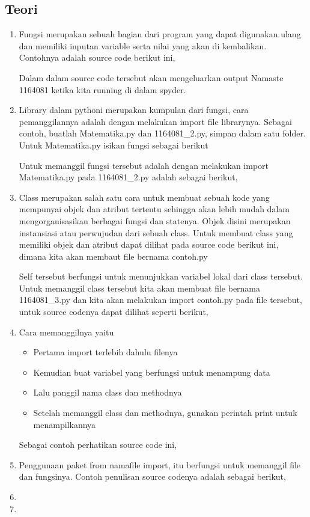 \subsection{Teori}
\begin{enumerate}
\item Fungsi merupakan sebuah bagian dari program yang dapat digunakan ulang dan memiliki inputan variable serta nilai yang akan di kembalikan. Contohnya adalah source code berikut ini,
	 
Dalam dalam source code tersebut akan mengeluarkan output Namaste 1164081 ketika kita running di dalam spyder.

\item Library dalam pythoni merupakan kumpulan dari fungsi, cara pemanggilannya adalah dengan melakukan import file librarynya. Sebagai contoh, buatlah Matematika.py dan 1164081\_2.py, simpan dalam satu folder. Untuk Matematika.py isikan fungsi sebagai berikut
	 
Untuk memanggil fungsi tersebut adalah dengan melakukan import  Matematika.py pada 1164081\_2.py adalah sebagai berikut,
	 

\item Class merupakan salah satu cara untuk membuat sebuah kode yang mempunyai objek dan atribut tertentu sehingga akan lebih mudah dalam mengorganisasikan berbagai fungsi dan statenya. Objek disini merupakan instansiasi atau perwujudan dari sebuah class. Untuk membuat class yang memiliki objek dan atribut dapat dilihat pada source code berikut ini, dimana kita akan membaut file bernama contoh.py
	
Self tersebut berfungsi untuk menunjukkan variabel lokal dari class tersebut. Untuk memanggil class tersebut kita akan membuat file bernama 1164081\_3.py dan kita akan melakukan import contoh.py pada file tersebut, untuk source codenya dapat dilihat seperti berikut,
	

\item Cara memanggilnya yaitu
	\begin{itemize}
		\item Pertama import terlebih dahulu filenya
		\item Kemudian buat variabel yang berfungsi untuk menampung data
		\item Lalu panggil nama class dan methodnya
		\item Setelah memanggil class dan methodnya, gunakan perintah print untuk menampilkannya
	\end{itemize}
Sebagai contoh perhatikan source code ini,
	

\item  Penggunaan paket from namafile import, itu berfungsi untuk memanggil file dan fungsinya. Contoh penulisan source codenya adalah sebagai berikut,
	

\item  

\item 
\end{enumerate}


